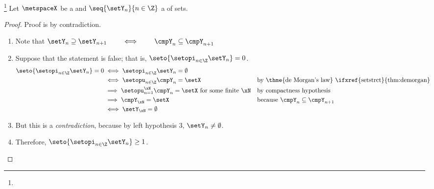 \begin{proposition}
\footnote{
  }
Let $\metspaceX$ be a  and 
$\seq{\setY_n}{n\in\Z}$ a   of sets.
\end{proposition}
\begin{proof}
Proof is by contradiction.
\begin{enumerate}
  \item Note that $\setY_n\supseteq\setY_{n+1} \qquad\iff\qquad \cmpY_n\subseteq\cmpY_{n+1}$
  \item Suppose that the statement is false; that is, $\seto{\setopi_{n\in\Z} \setY_n} =0$.
    \begin{align*}
      \seto{\setopi_{n\in\Z} \setY_n} =0
        &\iff     \setopi_{n\in\Z} \setY_n = \emptyset
      \\&\iff     \setopu_{n\in\Z} \cmpY_n = \setX
        &&        \text{by \thme{de Morgan's law} \ifxref{setstrct}{thm:demorgan}}
      \\&\implies \setopu_{n=1}^\xN \cmpY_n = \setX \text{ for some finite $\xN$}
        &&        \text{by compactness hypothesis}
      \\&\implies \cmpY_\xN = \setX
        &&        \text{because $\cmpY_n\subseteq\cmpY_{n+1}$}
      \\&\iff     \setY_\xN = \emptyset
    \end{align*}

  \item But this is a \emph{contradiction}, because by left hypothesis 3, $\setY_n\ne \emptyset$.
  \item Therefore, $\seto{\setopi_{n\in\Z} \setY_n} \ge 1$.
\end{enumerate}
\end{proof}


